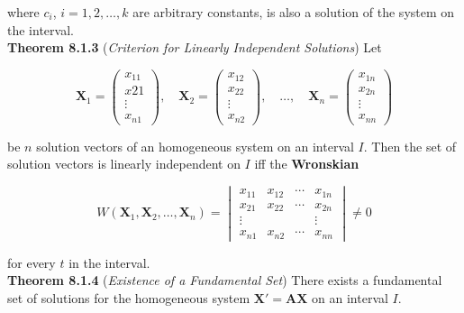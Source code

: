 \documentclass[12pt]{article}
\begin{document}
\noindent where \(c_i\), \(i = 1, 2, \ldots, k\) are arbitrary constants, is also a solution of the system on the interval.\\

\noindent\textbf{Theorem 8.1.3} (\emph{Criterion for Linearly Independent Solutions}) Let

\begin{equation}
    \mathbf{X}_1 = \begin{pmatrix}
        x_{11}\\
        x{21}\\
        \vdots\\
        x_{n1}
    \end{pmatrix}, \quad
    \mathbf{X}_2 = \begin{pmatrix}
        x_{12}\\
        x_{22}\\
        \vdots\\
        x_{n2}
    \end{pmatrix}, \quad \ldots, \quad
    \mathbf{X}_n = \begin{pmatrix}
        x_{1n}\\
        x_{2n}\\
        \vdots\\
        x_{nn}
    \end{pmatrix}
\end{equation}

\noindent be \(n\) solution vectors of an homogeneous system on an interval \(I\). Then the set of solution vectors is linearly independent on \(I\) iff the \textbf{Wronskian}

\begin{equation}
    W(\mathbf{X}_1, \mathbf{X}_2, \ldots, \mathbf{X}_n) = \begin{vmatrix}
        x_{11} & x_{12} & \cdots & x_{1n}\\
        x_{21} & x_{22} & \cdots & x_{2n}\\
        \vdots & & & \vdots\\
        x_{n1} & x_{n2} & \cdots & x_{nn} 
    \end{vmatrix} \neq 0
\end{equation}

\noindent for every \(t\) in the interval.\\

\noindent\textbf{Theorem 8.1.4} (\emph{Existence of a Fundamental Set}) There exists a fundamental set of solutions for the homogeneous system \(\mathbf{X'} = \mathbf{AX}\) on an interval \(I\).\\
\end{document}
